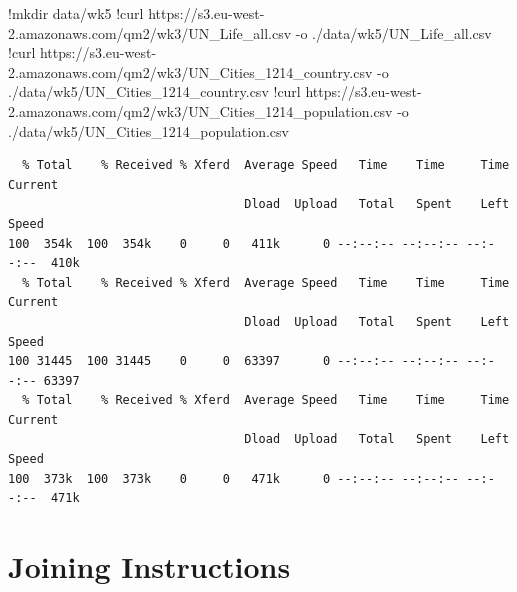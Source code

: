 \documentclass[
  letterpaper,
  DIV=11,
  numbers=noendperiod]{scrreprt}
\newenvironment{Shaded}{\begin{snugshade}}{\end{snugshade}}
\newcommand{\ErrorTok}[1]{\textcolor[rgb]{0.68,0.00,0.00}{#1}}
\newcommand{\FloatTok}[1]{\textcolor[rgb]{0.68,0.00,0.00}{#1}}
\newcommand{\NormalTok}[1]{\textcolor[rgb]{0.00,0.23,0.31}{#1}}
\newcommand{\OperatorTok}[1]{\textcolor[rgb]{0.37,0.37,0.37}{#1}}
\begin{document}
\begin{Shaded}
\begin{Highlighting}[]
\OperatorTok{!}\NormalTok{mkdir data}\OperatorTok{/}\NormalTok{wk5}
\OperatorTok{!}\NormalTok{curl https:}\OperatorTok{//}\NormalTok{s3.eu}\OperatorTok{{-}}\NormalTok{west}\OperatorTok{{-}}\FloatTok{2.}\ErrorTok{amazonaws}\NormalTok{.com}\OperatorTok{/}\NormalTok{qm2}\OperatorTok{/}\NormalTok{wk3}\OperatorTok{/}\NormalTok{UN\_Life\_all.csv }\OperatorTok{{-}}\NormalTok{o .}\OperatorTok{/}\NormalTok{data}\OperatorTok{/}\NormalTok{wk5}\OperatorTok{/}\NormalTok{UN\_Life\_all.csv}
\OperatorTok{!}\NormalTok{curl https:}\OperatorTok{//}\NormalTok{s3.eu}\OperatorTok{{-}}\NormalTok{west}\OperatorTok{{-}}\FloatTok{2.}\ErrorTok{amazonaws}\NormalTok{.com}\OperatorTok{/}\NormalTok{qm2}\OperatorTok{/}\NormalTok{wk3}\OperatorTok{/}\NormalTok{UN\_Cities\_1214\_country.csv }\OperatorTok{{-}}\NormalTok{o .}\OperatorTok{/}\NormalTok{data}\OperatorTok{/}\NormalTok{wk5}\OperatorTok{/}\NormalTok{UN\_Cities\_1214\_country.csv}
\OperatorTok{!}\NormalTok{curl https:}\OperatorTok{//}\NormalTok{s3.eu}\OperatorTok{{-}}\NormalTok{west}\OperatorTok{{-}}\FloatTok{2.}\ErrorTok{amazonaws}\NormalTok{.com}\OperatorTok{/}\NormalTok{qm2}\OperatorTok{/}\NormalTok{wk3}\OperatorTok{/}\NormalTok{UN\_Cities\_1214\_population.csv }\OperatorTok{{-}}\NormalTok{o .}\OperatorTok{/}\NormalTok{data}\OperatorTok{/}\NormalTok{wk5}\OperatorTok{/}\NormalTok{UN\_Cities\_1214\_population.csv}
\end{Highlighting}
\end{Shaded}

\begin{verbatim}
  % Total    % Received % Xferd  Average Speed   Time    Time     Time  Current
                                 Dload  Upload   Total   Spent    Left  Speed
100  354k  100  354k    0     0   411k      0 --:--:-- --:--:-- --:--:--  410k
  % Total    % Received % Xferd  Average Speed   Time    Time     Time  Current
                                 Dload  Upload   Total   Spent    Left  Speed
100 31445  100 31445    0     0  63397      0 --:--:-- --:--:-- --:--:-- 63397
  % Total    % Received % Xferd  Average Speed   Time    Time     Time  Current
                                 Dload  Upload   Total   Spent    Left  Speed
100  373k  100  373k    0     0   471k      0 --:--:-- --:--:-- --:--:--  471k
\end{verbatim}

\hypertarget{joining-instructions}{%
\section{Joining Instructions}\label{joining-instructions}}
\end{document}
